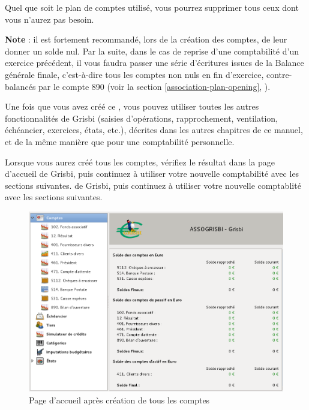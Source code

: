 Quel que soit le plan de comptes utilisé, vous pourrez supprimer tous ceux dont vous n’aurez pas besoin.

\textbf{Note} : il est fortement recommandé, lors de la création des comptes, de leur donner un solde nul. Par la suite, dans le cas de reprise d'une comptabilité d'un exercice précédent, il vous faudra passer une série d'écritures issues de la Balance générale finale, c'est-à-dire tous les comptes non nuls en fin d'exercice, contre-balancés par le compte 890 (voir la section \vref{association-plan-opening}, ).

Une fois que vous avez créé ce , vous pouvez utiliser toutes les autres fonctionnalités de Grisbi (saisies d'opérations, rapprochement, ventilation, échéancier, exercices, états, etc.), décrites dans les autres chapitres de ce manuel, et de la même manière que pour une comptabilité personnelle.

Lorsque vous aurez créé tous les comptes, vérifiez le résultat dans la page d'accueil \ifIllustration de Grisbi, puis continuez à utiliser votre nouvelle comptabilité avec les sections suivantes.
\else de Grisbi, puis continuez à utiliser votre nouvelle comptablité avec les sections suivantes.
\fi

\ifIllustration
\begin{figure}[ht]
\begin{center}
\includegraphics[scale=0.5]{image/screenshot/asso_account_creation}
\end{center}
\caption{Page d'accueil après création de tous les comptes}
\label{asso-account-creation-img}
\end{figure}
\fi

